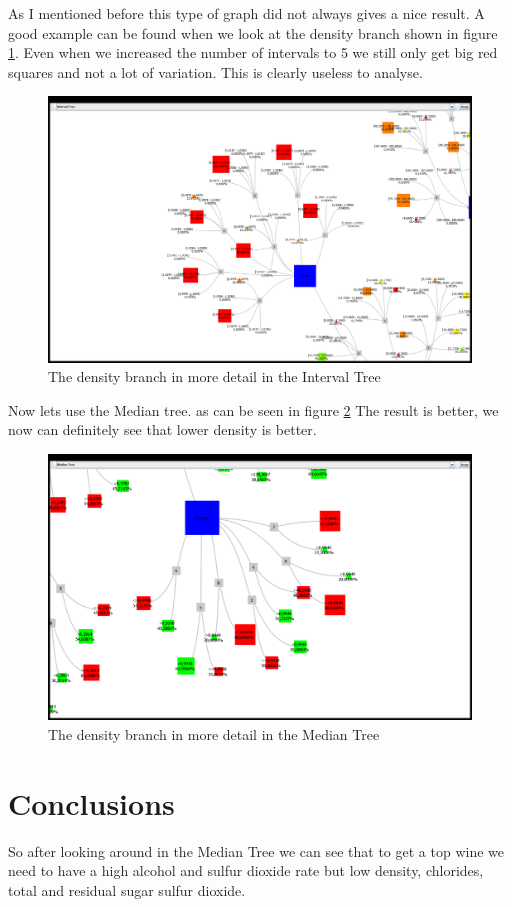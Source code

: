 \documentclass[a4paper,twoside,11pt]{article}
\begin{document}
As I mentioned before this type of graph did not always gives a nice result. A good example can be found when we look at the density branch shown in figure \ref{rsit}. Even when we increased the number of intervals to 5 we still only get big red squares and not a lot of variation. This is clearly useless to analyse.
\begin{figure}[!h]
  \centering
  \includegraphics[width=\textwidth]{20131105041005plot.png}
  \caption{The density branch in more detail in the Interval Tree}
  \label{rsit}
\end{figure}

Now lets use the Median tree. as can be seen in figure \ref{rsmt} The result is better, we now can definitely see that lower density is better.
\begin{figure}[!h]
  \centering
  \includegraphics[width=\textwidth]{20131105041127plot.png}
  \caption{The density branch in more detail in the Median Tree}
  \label{rsmt}
\end{figure}

\section{Conclusions}
So after looking around in the Median Tree we can see that to get a top wine we need to have a high alcohol and sulfur dioxide rate but low density, chlorides, total and residual sugar sulfur dioxide.
\end{document}
